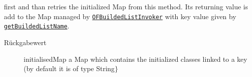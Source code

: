 \begin{description}
 first and than retries the initialized Map from this method. Its returning value is add to the Map 
 managed by \texttt{\hyperlink{ontologyFramework.OFRunning.OFInvokingManager.OFBuildedListInvoker-class}{OFBuildedListInvoker}} with key value given by \texttt{\hyperlink{ontologyFramework.OFRunning.OFInitialising.OFBuilderCommon.getBuildedListName(org.semanticweb.owlapi.model.OWLNamedIndividual,ontologyFramework.OFContextManagement.OWLReferences)}{getBuildedListName}}.
\begin{description}
\item[Rückgabewert] 
initialisedMap a Map which contains the initialized classes linked to a key (by default it 
 is of type String$\}$
\end{description}
\end{description}
